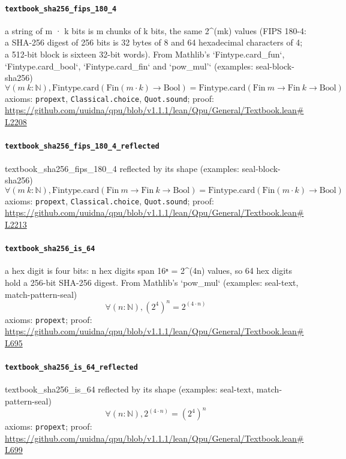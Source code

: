 \documentclass[11pt]{article}
\begin{document}
\paragraph{\texttt{textbook\_sha256\_fips\_180\_4}}
a string of m · k bits is m chunks of k bits, the same 2\^{}(mk) values (FIPS 180-4: a SHA-256 digest of 256 bits is 32 bytes of 8 and 64 hexadecimal characters of 4; a 512-bit block is sixteen 32-bit words). From Mathlib's `Fintype.card\_fun`, `Fintype.card\_bool`, `Fintype.card\_fin` and `pow\_mul'` (examples: seal-block-sha256)
\[ \forall (m\ k : \mathbb{N}), \mathrm{Fintype.card} (\mathrm{Fin} (m \cdot k) \to \mathrm{Bool}) = \mathrm{Fintype.card} (\mathrm{Fin}\ m \to \mathrm{Fin}\ k \to \mathrm{Bool}) \]
\noindent axioms: \texttt{propext}, \texttt{Classical.choice}, \texttt{Quot.sound}; proof: \url{https://github.com/uuidna/qpu/blob/v1.1.1/lean/Qpu/General/Textbook.lean\#L2208}

\paragraph{\texttt{textbook\_sha256\_fips\_180\_4\_reflected}}
textbook\_sha256\_fips\_180\_4 reflected by its shape (examples: seal-block-sha256)
\[ \forall (m\ k : \mathbb{N}), \mathrm{Fintype.card} (\mathrm{Fin}\ m \to \mathrm{Fin}\ k \to \mathrm{Bool}) = \mathrm{Fintype.card} (\mathrm{Fin} (m \cdot k) \to \mathrm{Bool}) \]
\noindent axioms: \texttt{propext}, \texttt{Classical.choice}, \texttt{Quot.sound}; proof: \url{https://github.com/uuidna/qpu/blob/v1.1.1/lean/Qpu/General/Textbook.lean\#L2213}

\paragraph{\texttt{textbook\_sha256\_is\_64}}
a hex digit is four bits: n hex digits span 16ⁿ = 2\^{}(4n) values, so 64 hex digits hold a 256-bit SHA-256 digest. From Mathlib's `pow\_mul` (examples: seal-text, match-pattern-seal)
\[ \forall (n : \mathbb{N}), (2 ^{4}) ^{n} = 2 ^{(4 \cdot n)} \]
\noindent axioms: \texttt{propext}; proof: \url{https://github.com/uuidna/qpu/blob/v1.1.1/lean/Qpu/General/Textbook.lean\#L695}

\paragraph{\texttt{textbook\_sha256\_is\_64\_reflected}}
textbook\_sha256\_is\_64 reflected by its shape (examples: seal-text, match-pattern-seal)
\[ \forall (n : \mathbb{N}), 2 ^{(4 \cdot n)} = (2 ^{4}) ^{n} \]
\noindent axioms: \texttt{propext}; proof: \url{https://github.com/uuidna/qpu/blob/v1.1.1/lean/Qpu/General/Textbook.lean\#L699}
\end{document}
